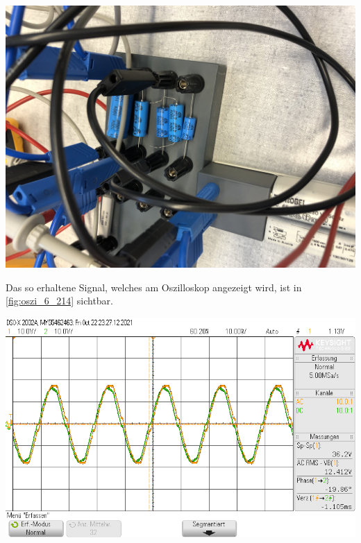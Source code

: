 \documentclass[11pt,ngerman]{scrartcl}
\begin{document}
\begin{center}
	\begin{minipage}[t]{0.5\textwidth}
		\includegraphics[angle=-90,width=\textwidth]{kap_losung}
		\label{fig:kap_losung}
	\end{minipage}
\end{center}

\newpage

Das so erhaltene Signal, welches am Oszilloskop angezeigt wird, ist in \autoref{fig:oszi_6_214} sichtbar.

\begin{center}
	\begin{minipage}[t]{0.7\textwidth}
		\includegraphics[width=\textwidth]{Phasenzeug/scope_21}
		\label{fig:oszi_6_214}
	\end{minipage}
\end{center}
\end{document}
